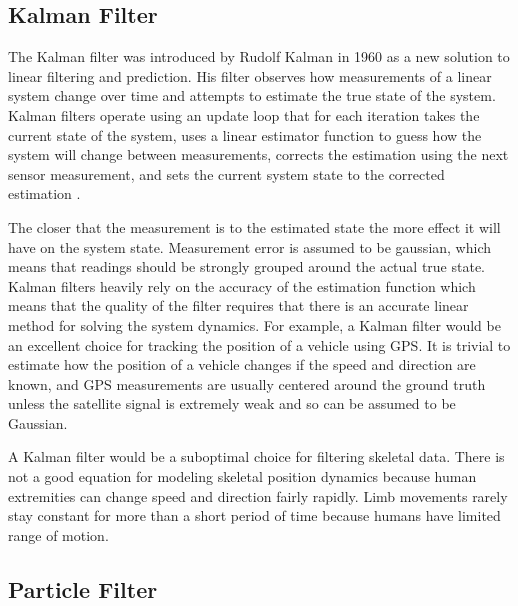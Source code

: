 \subsection{Kalman Filter}

The Kalman filter was introduced by Rudolf Kalman in 1960 as a new solution to linear filtering and prediction. His filter observes how measurements of a linear system change over time and attempts to estimate the true state of the system. Kalman filters operate using an update loop that for each iteration takes the current state of the system, uses a linear estimator function to guess how the system will change between measurements, corrects the estimation using the next sensor measurement, and sets the current system state to the corrected estimation \cite{kalman1960new}. 

The closer that the measurement is to the estimated state the more effect it will have on the system state. Measurement error is assumed to be gaussian, which means that readings should be strongly grouped around the actual true state. Kalman filters heavily rely on the accuracy of the estimation function which means that the quality of the filter requires that there is an accurate linear method for solving the system dynamics. For example, a Kalman filter would be an excellent choice for tracking the position of a vehicle using GPS. It is trivial to estimate how the position of a vehicle changes if the speed and direction are known, and GPS measurements are usually centered around the ground truth unless the satellite signal is extremely weak and so can be assumed to be Gaussian. 

A Kalman filter would be a suboptimal choice for filtering skeletal data. There is not a good equation for modeling skeletal position dynamics because human extremities can change speed and direction fairly rapidly. Limb movements rarely stay constant for more than a short period of time because humans have limited range of motion. 

\subsection{Particle Filter}

